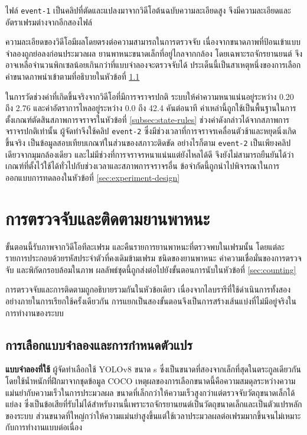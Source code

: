 ไฟล์ \texttt{event-1} เป็นคลิปที่ตัดและแปลงมาจากวิดีโอต้นฉบับความละเอียดสูง จึงมีความละเอียดและอัตราเฟรมต่างจากอีกสองไฟล์

ความละเอียดของวิดีโอมีผลโดยตรงต่อความสามารถในการตรวจจับ เนื่องจากขนาดภาพที่ป้อนเข้าแบบจำลองถูกย่อลงก่อนประมวลผล ยานพาหนะขนาดเล็กที่อยู่ไกลจากกล้อง โดยเฉพาะรถจักรยานยนต์ จึงอาจเหลือจำนวนพิกเซลน้อยเกินกว่าที่แบบจำลองจะตรวจจับได้  ประเด็นนี้เป็นสาเหตุหนึ่งของการเลือกค่าขนาดภาพนำเข้าตามที่อธิบายในหัวข้อที่ \ref{subsec:model-params}

ในการวัดช่วงค่าที่เกิดขึ้นจริงจากวิดีโอที่มีการจราจรปกติ ระบบให้ค่าความหนาแน่นอยู่ระหว่าง 0.20 ถึง 2.76 และค่าอัตราการไหลอยู่ระหว่าง 0.0 ถึง 42.4 คันต่อนาที ค่าเหล่านี้ถูกใช้เป็นพื้นฐานในการตั้งเกณฑ์ตัดสินสภาพการจราจรในหัวข้อที่ \ref{subsec:state-rules}  ช่วงค่าดังกล่าวได้จากสภาพการจราจรปกติเท่านั้น ผู้จัดทำจึงใช้คลิป \texttt{event-2} ซึ่งมีช่วงเวลาที่การจราจรเคลื่อนตัวช้าและหยุดนิ่งเกิดขึ้นจริง เป็นข้อมูลสอบเทียบเกณฑ์ในส่วนของสภาวะติดขัด อย่างไรก็ตาม \texttt{event-2} เป็นเพียงคลิปเดียวจากมุมกล้องเดียว และไม่มีช่วงที่การจราจรหนาแน่นแต่ยังไหลได้ดี จึงยังไม่สามารถยืนยันได้ว่าเกณฑ์ที่ตั้งไว้ใช้ได้ทั่วไปกับช่วงเวลาและสภาพการจราจรอื่น ข้อจำกัดนี้ถูกนำไปพิจารณาในการออกแบบการทดลองในหัวข้อที่ \ref{sec:experiment-design}

\section{การตรวจจับและติดตามยานพาหนะ}
\label{sec:vehicle-detection}

ขั้นตอนนี้รับภาพจากวิดีโอทีละเฟรม และคืนรายการยานพาหนะที่ตรวจพบในเฟรมนั้น โดยแต่ละรายการประกอบด้วยรหัสประจำตัวที่คงเดิมข้ามเฟรม ชนิดของยานพาหนะ ค่าความเชื่อมั่นของการตรวจจับ และพิกัดกรอบล้อมในภาพ ผลลัพธ์ชุดนี้ถูกส่งต่อไปยังขั้นตอนการนับในหัวข้อที่ \ref{sec:counting}

การตรวจจับและการติดตามถูกอธิบายรวมกันในหัวข้อเดียว เนื่องจากไลบรารีที่ใช้ดำเนินการทั้งสองอย่างภายในการเรียกใช้ครั้งเดียวกัน การแยกเป็นสองขั้นตอนจึงเป็นการสร้างเส้นแบ่งที่ไม่มีอยู่จริงในการทำงานของระบบ

\subsection{การเลือกแบบจำลองและการกำหนดตัวแปร}
\label{subsec:model-params}

\textbf{แบบจำลองที่ใช้} ผู้จัดทำเลือกใช้ YOLOv8 ขนาด s ซึ่งเป็นขนาดที่สองจากเล็กที่สุดในตระกูลเดียวกัน โดยใช้น้ำหนักที่ฝึกมาจากชุดข้อมูล COCO  เหตุผลของการเลือกขนาดนี้คือความสมดุลระหว่างความแม่นยำกับความเร็วในการประมวลผล ขนาดที่เล็กกว่าให้ความเร็วสูงกว่าแต่ตรวจจับวัตถุขนาดเล็กได้แย่ลง ซึ่งเป็นข้อเสียที่รับไม่ได้สำหรับงานนี้เพราะรถจักรยานยนต์เป็นวัตถุขนาดเล็กและเป็นตัวแปรหลักของระบบ ส่วนขนาดที่ใหญ่กว่าให้ความแม่นยำสูงขึ้นแต่ใช้เวลาประมวลผลต่อเฟรมมากขึ้นจนไม่เหมาะกับการทำงานแบบต่อเนื่อง

